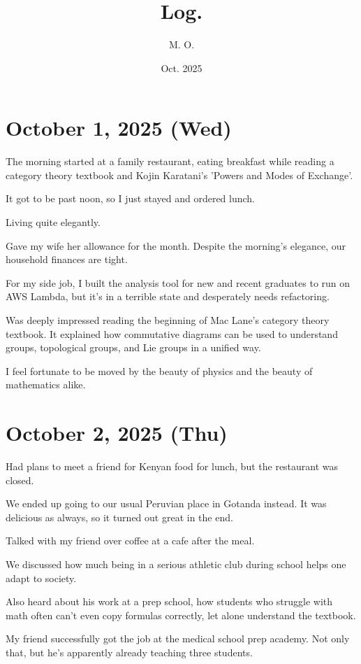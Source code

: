 \documentclass[uplatex]{jsarticle}
\title{
Log.
}
\author{
M. O.
}
\date{Oct. 2025}
\begin{document}
\maketitle

\section{October 1, 2025 (Wed)}

The morning started at a family restaurant, eating breakfast while reading a category theory textbook and Kojin Karatani's 'Powers and Modes of Exchange'.

It got to be past noon, so I just stayed and ordered lunch.

Living quite elegantly.

Gave my wife her allowance for the month. Despite the morning's elegance, our household finances are tight.

For my side job, I built the analysis tool for new and recent graduates to run on AWS Lambda, but it's in a terrible state and desperately needs refactoring.

Was deeply impressed reading the beginning of Mac Lane's category theory textbook. It explained how commutative diagrams can be used to understand groups, topological groups, and Lie groups in a unified way.

I feel fortunate to be moved by the beauty of physics and the beauty of mathematics alike.

\section{October 2, 2025 (Thu)}

Had plans to meet a friend for Kenyan food for lunch, but the restaurant was closed.

We ended up going to our usual Peruvian place in Gotanda instead.
It was delicious as always, so it turned out great in the end.

Talked with my friend over coffee at a cafe after the meal.

We discussed how much being in a serious athletic club during school helps one adapt to society.

Also heard about his work at a prep school, how students who struggle with math often can't even copy formulas correctly, let alone understand the textbook.

My friend successfully got the job at the medical school prep academy. Not only that, but he's apparently already teaching three students.
\end{document}

